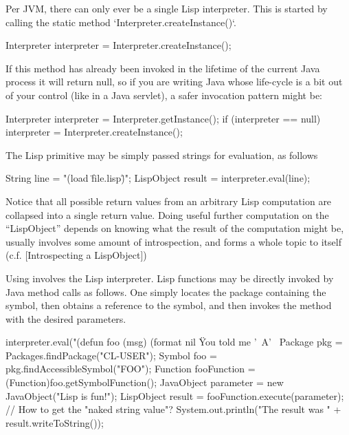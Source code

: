\documentclass[10pt]{book}
\begin{document}
Per JVM, there can only ever be a single Lisp interpreter.  This is
started by calling the static method `Interpreter.createInstance()`.

\begin{listing-java}
  Interpreter interpreter = Interpreter.createInstance();
\end{listing-java}

If this method has already been invoked in the lifetime of the current
Java process it will return null, so if you are writing Java whose
life-cycle is a bit out of your control (like in a Java servlet), a
safer invocation pattern might be:

\begin{listing-java}
  Interpreter interpreter = Interpreter.getInstance();
  if (interpreter == null) {
    interpreter = Interpreter.createInstance();
  }
\end{listing-java}


The Lisp  primitive may be simply passed strings for evaluation,
as follows

\begin{listing-java}
  String line = "(load \"file.lisp\")";
  LispObject result = interpreter.eval(line);
\end{listing-java}

Notice that all possible return values from an arbitrary Lisp
computation are collapsed into a single return value.  Doing useful
further computation on the ``LispObject'' depends on knowing what the
result of the computation might be, usually involves some amount
of  introspection, and forms a whole topic to itself
(c.f. [Introspecting a LispObject])

Using  involves the Lisp interpreter.  Lisp functions may
be directly invoked by Java method calls as follows.  One simply
locates the package containing the symbol, then obtains a reference to
the symbol, and then invokes the  method with the
desired parameters.

\begin{listing-java}
    interpreter.eval("(defun foo (msg) (format nil \"You told me '~A'~%
    Package pkg = Packages.findPackage("CL-USER");
    Symbol foo = pkg.findAccessibleSymbol("FOO"); 
    Function fooFunction = (Function)foo.getSymbolFunction();
    JavaObject parameter = new JavaObject("Lisp is fun!");
    LispObject result = fooFunction.execute(parameter);
    // How to get the "naked string value"?
    System.out.println("The result was " + result.writeToString()); 
\end{listing-java}
\end{document}

